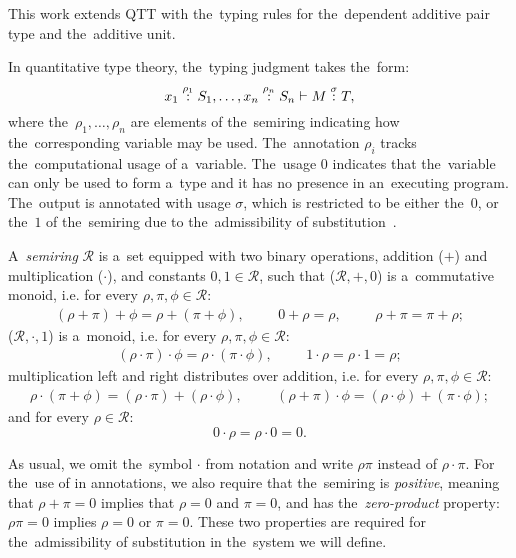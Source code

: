 This work extends QTT with the~typing rules for the~dependent additive pair type
and the~additive unit.


In quantitative type theory, the~typing judgment takes the~form:
\[
  x_1 \overset{\rho_1}: S_1, \dotsc, x_n \overset{\rho_n}: S_n \vdash M \overset{\sigma}: T,
\]
where the~$\rho_1, \dotsc, \rho_n$ are elements of the~semiring indicating
how the~corresponding variable may be used. The~annotation $\rho_i$ tracks
the~computational usage of a~variable. The~usage $0$ indicates that the~variable
can only be used to form a~type and it has no presence in an~executing program.
The~output is annotated with usage $\sigma$, which is restricted to be either
the~$0$, or the~$1$ of the~semiring due to the~admissibility of
substitution~\citep{atkey_2018}.

\begin{definition}
  A~\emph{semiring} $\mathcal{R}$ is a~set equipped with two binary operations,
  addition ($+$) and multiplication ($\cdot$), and constants $0, 1 \in
  \mathcal{R}$, such that ($\mathcal{R}, +, 0$) is a~commutative monoid, i.e.
  for every $\rho, \pi, \phi \in \mathcal{R}$:
  \begin{align*}
    (\rho+\pi)+\phi = \rho+(\pi+\phi),&  &  &0 + \rho = \rho,&  &
    &\rho + \pi = \pi + \rho;
  \end{align*}
  ($\mathcal{R}, \cdot, 1$) is a~monoid, i.e. for every $\rho, \pi, \phi
  \in \mathcal{R}$:
  \begin{align*}
    (\rho \cdot \pi) \cdot \phi = \rho \cdot (\pi \cdot \phi),&  &
    &1 \cdot \rho = \rho \cdot 1 = \rho;
  \end{align*}
  multiplication left and right distributes over addition, i.e. for every $\rho,
  \pi, \phi \in \mathcal{R}$:
  \begin{align*}
    \rho \cdot (\pi + \phi) = (\rho \cdot \pi) + (\rho \cdot \phi),&  &
    &(\rho + \pi) \cdot \phi = (\rho \cdot \phi) + (\pi \cdot \phi);
  \end{align*}
  and for every $\rho \in \mathcal{R}$:
  \[
    0 \cdot \rho = \rho \cdot 0 = 0.
  \]
\end{definition}
As usual, we omit the~symbol $\cdot$ from notation and write $\rho\pi$ instead
of $\rho\cdot\pi$. For the~use of in annotations, we also require that
the~semiring is \emph{positive}, meaning that $\rho + \pi = 0$ implies that
$\rho = 0$ and $\pi = 0$, and has the~\emph{zero-product} property:
$\rho\pi = 0$ implies $\rho = 0$ or $\pi = 0$. These two properties are required
for the~admissibility of substitution in the~system we will define.

